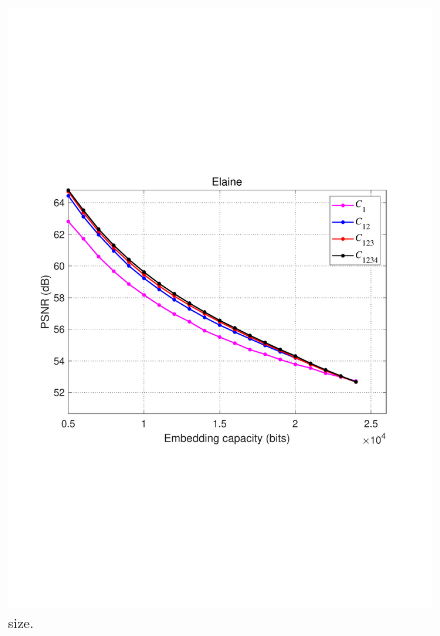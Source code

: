 \documentclass[review,3p,10pt,sort&compress]{elsarticle}
\begin{document}
\begin{figure}
{\begin{minipage}[t]{0.45\linewidth}
\includegraphics[width=1\textwidth]{figures/Result/size/Elaine.pdf}
\end{minipage}
}
\centering
\caption{size.}
\label{fig:size}       %
\end{figure}
\end{document}
